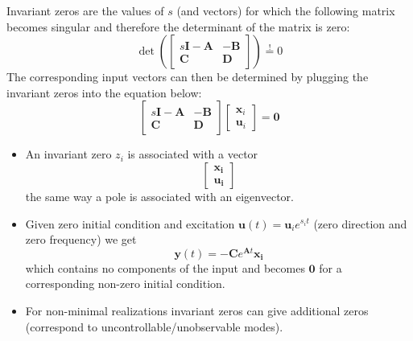 Invariant zeros are the values of $s$ (and vectors) for which the following matrix becomes singular and therefore the determinant of the matrix is zero:
\begin{equation*}
    \det \left(\begin{bmatrix}
            s\mathbf{I}-\mathbf{A} & -\mathbf{B} \\
            \mathbf{C}             & \mathbf{D}
        \end{bmatrix}\right) \overset{!}{=}0
\end{equation*}
The corresponding input vectors can then be determined by plugging the invariant zeros into the equation below:
\begin{equation*}
    \begin{bmatrix}
        s\mathbf{I}-\mathbf{A} & -\mathbf{B} \\
        \mathbf{C}             & \mathbf{D}
    \end{bmatrix}
    \begin{bmatrix}
        \mathbf{x}_i \\
        \mathbf{u}_i
    \end{bmatrix}=\mathbf{0}
\end{equation*}


\begin{itemize}
    \item An invariant zero $z_i$ is associated with a vector
          \begin{equation*}
              \begin{bmatrix}
                  \mathbf{x_i} \\
                  \mathbf{u_i}
              \end{bmatrix}
          \end{equation*}
          the same way a pole is associated with an eigenvector.
    \item Given zero initial condition and excitation $\mathbf{u}(t)=\mathbf{u}_i e^{s_i t}$ (zero direction and zero frequency) we get
          \begin{equation*}
              \mathbf{y}(t)=-\mathbf{C}e^{\mathbf{A}t}\mathbf{x_i}
          \end{equation*} which contains no components of the input and becomes $\mathbf{0}$ for a corresponding non-zero initial condition.    %
    \item For non-minimal realizations invariant zeros can give additional zeros (correspond to uncontrollable/unobservable modes).
\end{itemize}


